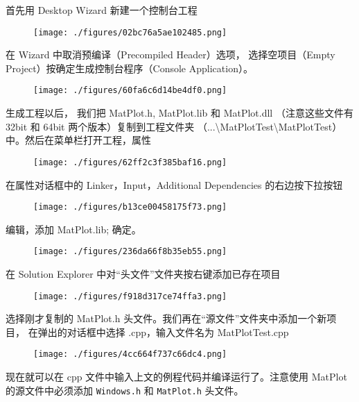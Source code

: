 首先用 Desktop Wizard 新建一个控制台工程
\begin{figure}[ht]
\centering
\texttt{[image: ./figures/02bc76a5ae102485.png]}
\caption{} \label{fig_MtPlot_9}
\end{figure}

在 Wizard 中取消预编译（Precompiled Header）选项， 选择空项目（Empty Project）按确定生成控制台程序（Console Application）。

\begin{figure}[ht]
\centering
\texttt{[image: ./figures/60fa6c6d14be4df0.png]}
\caption{} \label{fig_MtPlot_10}
\end{figure}

生成工程以后， 我们把 MatPlot.h, MatPlot.lib 和 MatPlot.dll （注意这些文件有 32bit 和 64bit 两个版本）复制到工程文件夹 （...\textbackslash MatPlotTest\textbackslash MatPlotTest）中。然后在菜单栏打开工程，属性

\begin{figure}[ht]
\centering
\texttt{[image: ./figures/62ff2c3f385baf16.png]}
\caption{} \label{fig_MtPlot_11}
\end{figure}

在属性对话框中的 Linker，Input，Additional Dependencies 的右边按下拉按钮

\begin{figure}[ht]
\centering
\texttt{[image: ./figures/b13ce00458175f73.png]}
\caption{} \label{fig_MtPlot_12}
\end{figure}

编辑，添加 MatPlot.lib; 确定。

\begin{figure}[ht]
\centering
\texttt{[image: ./figures/236da66f8b35eb55.png]}
\caption{} \label{fig_MtPlot_13}
\end{figure}

在 Solution Explorer 中对“头文件”文件夹按右键添加已存在项目

\begin{figure}[ht]
\centering
\texttt{[image: ./figures/f918d317ce74ffa3.png]}
\caption{} \label{fig_MtPlot_14}
\end{figure}

选择刚才复制的 MatPlot.h 头文件。我们再在“源文件”文件夹中添加一个新项目， 在弹出的对话框中选择 .cpp，输入文件名为 MatPlotTest.cpp

\begin{figure}[ht]
\centering
\texttt{[image: ./figures/4cc664f737c66dc4.png]}
\caption{} \label{fig_MtPlot_15}
\end{figure}

现在就可以在 cpp 文件中输入上文的例程代码并编译运行了。注意使用 MatPlot 的源文件中必须添加 \verb`Windows.h` 和 \verb`MatPlot.h` 头文件。
